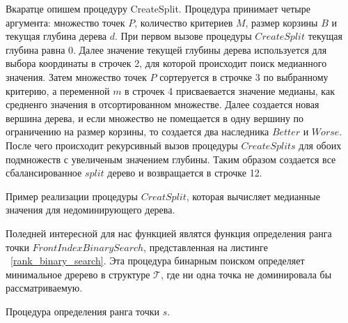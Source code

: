 Вкаратце опишем процедуру CreateSplit. Процедура принимает четыре аргумента: множество точек $P$, количество критериев $M$, размер корзины $B$ и текущая глубина дерева $d$. При первом вызове процедуры $CreateSplit$ текущая глубина равна $0$. Далее значение текущей глубины дерева используется для выбора координаты в строчек 2, для которой происходит поиск медианного значения. Затем множество точек $P$ сортеруется в строчке 3 по выбранному критерию, а переменной $m$ в строчек 4 присваевается значение медианы, как средненго значения в отсортированном множестве. Далее создается новая вершина дерева, и если множество не помещается в одну вершину по ограничению на размер корзины, то создается два наследника $Better$ и $Worse$. После чего происходит рекурсивный вызов процедуры $CreateSplits$ для обоих подмножеств с увеличеным значением глубины. Таким образом создается все сбалансированное $split$ дерево и возвращается в строчке 12. 

\begin{algorithm}
\begin{algorithmic}[1]
    \EndIf
\EndProcedure
\end{algorithmic}
\caption{Пример реализации процедуры $CreatSplit$, которая вычисляет медианные значения для недоминирующего дерева.}
\label{create_split}
\end{algorithm}

Поледней интересной для нас функцией являтся функция определения ранга точки $FrontIndexBinarySearch$, представленная на листинге ~\ref{rank_binary_search}. Эта процедура бинарным поиском определяет минимальное дререво в структуре $\mathcal{T}$, где ни одна точка не доминировала бы рассматриваемую. 

\begin{algorithm}
\begin{algorithmic}[1]
        \Else
        \EndIf    
    \EndWhile
\EndProcedure
\end{algorithmic}
\caption{Процедура определения ранга точки $s$.}
\label{rank_binary_search}
\end{algorithm}

